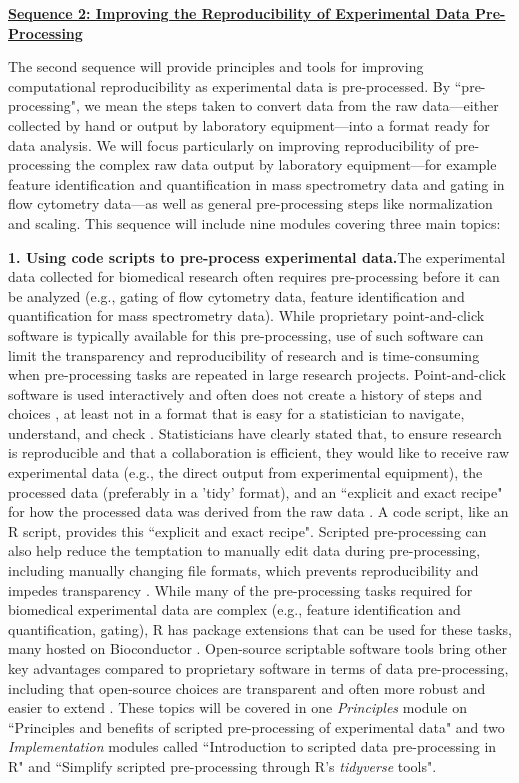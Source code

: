 \documentclass[pdftex,english,11pt,parskip=half]{scrartcl}
\begin{document}
\underline{\textbf{Sequence 2: Improving the Reproducibility of Experimental Data
Pre-Processing}}

The second sequence will provide principles and tools for improving
computational reproducibility as
experimental data is pre-processed. By ``pre-processing", we mean the steps 
taken to convert data from the raw data---either collected by hand or output
by laboratory equipment---into a format ready for data analysis. We will focus
particularly on improving reproducibility of pre-processing the complex 
raw data output by laboratory equipment---for example feature identification 
and quantification in mass spectrometry data and gating in flow cytometry data---as well
as general pre-processing steps like normalization and scaling. This sequence will include nine modules covering three main topics: 

\textbf{1. Using code scripts to pre-process experimental data.}The experimental data collected for biomedical research often requires 
pre-processing before it can be analyzed (e.g., gating of flow cytometry data, 
feature identification 
and quantification for mass spectrometry data). While 
proprietary point-and-click software is typically available for this pre-processing,
use of such software can limit the transparency and reproducibility of research and is 
time-consuming when pre-processing tasks are repeated in large research projects. Point-and-click software is used interactively and often does not create a history of steps and choices \cite{pernet2015improving}, at least not in a format that is easy for a statistician to navigate, understand, and check \cite{peng2011reproducible, pernet2015improving}. 
Statisticians have clearly stated that, to ensure research is reproducible and that a collaboration is efficient, they would like to receive raw experimental data (e.g., the direct output from experimental equipment), the processed data (preferably in a 'tidy' format), and an ``explicit and exact recipe" for how the processed data was derived from the raw data \cite{ellis2018share}.
A code script, like an R script, provides this ``explicit and exact recipe". Scripted pre-processing can also help reduce the temptation to manually edit data during pre-processing, including manually changing file formats, which prevents reproducibility and impedes transparency \cite{pernet2015improving}. While many of the pre-processing tasks required for biomedical experimental data are complex (e.g., feature identification and quantification, gating), R has package extensions that can be used for these tasks, many hosted on Bioconductor \cite{huber2015orchestrating}. 
Open-source scriptable
software tools bring other key advantages compared to proprietary software in terms of data
pre-processing, including that open-source choices are transparent and often more robust and easier to extend \cite{cetinkaya2017infrastructure, huber2015orchestrating,
brown2014reproducible, piccolo2016tools, baumer2018lessons}. 
These topics will be covered in one
\textit{Principles} module on ``Principles and benefits of scripted
pre-processing of experimental data" and two \textit{Implementation} modules
called ``Introduction to scripted data pre-processing in R" and ``Simplify
scripted pre-processing through R's \textit{tidyverse} tools".
\end{document}
